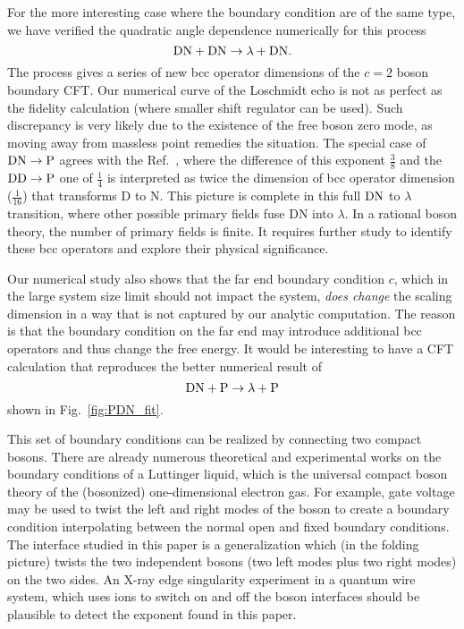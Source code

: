 For the more interesting case where the boundary condition are of the same type, we have verified the quadratic angle dependence numerically for this process 
\begin{equation}
{\rm DN} + {\rm DN} \rightarrow \lambda + {\rm DN} . 
\end{equation}
The process gives a series of new bcc operator dimensions of the $c = 2$ boson boundary CFT. Our numerical curve of the Loschmidt echo is not as perfect as the fidelity calculation (where smaller shift regulator can be used). Such discrepancy is very likely due to the existence of the free boson zero mode, as moving away from massless point remedies the situation. The special case of ${\rm DN} \rightarrow {\rm P}$ agrees with the Ref.~, where the difference of this exponent $\frac{3}{8}$ and the ${\rm DD} \rightarrow {\rm P}$ one of $\frac{1}{4}$ is interpreted as twice the dimension of bcc operator dimension ($\frac{1}{16}$) that transforms D to N. This picture is complete in this full ${\rm DN}$ to $\lambda $ transition, where other possible primary fields fuse DN into $\lambda$. In a rational boson theory, the number of primary fields is finite. It requires further study to identify these bcc operators and explore their physical significance. 


Our numerical study also shows that the far end boundary condition $c$, which in the large system size limit should not impact the system, {\it does change} the scaling dimension in a way that is not captured by our analytic computation. The reason is that the boundary condition on the far end may introduce additional bcc operators and thus change the free energy. It would be interesting to have a CFT calculation that reproduces the better numerical result of
\begin{equation}
{\rm DN} + {\rm P} \rightarrow \lambda + {\rm P} 
\end{equation}
shown in Fig.~\ref{fig:PDN_fit}.


This set of boundary conditions can be realized by connecting two compact bosons. There are already numerous theoretical and experimental works on the boundary conditions of a Luttinger liquid\cite{schmeltzer_zero_1999,anfuso_luttinger_2003,voit_bounded_2000,fabrizio_interacting_1995,egger_applying_1998}, which is the universal compact boson theory of the (bosonized) one-dimensional electron gas\cite{giamarchi_quantum_2015}. For example, gate voltage \cite{egger_applying_1998} may be used to twist the left and right modes of the boson to create a boundary condition interpolating between the normal open and fixed boundary conditions. The interface studied in this paper is a generalization which (in the folding picture) twists the two independent bosons (two left modes plus two right modes) on the two sides. An X-ray edge singularity experiment in a quantum wire system, which uses ions to switch on and off the boson interfaces should be plausible to detect the exponent found in this paper. 


